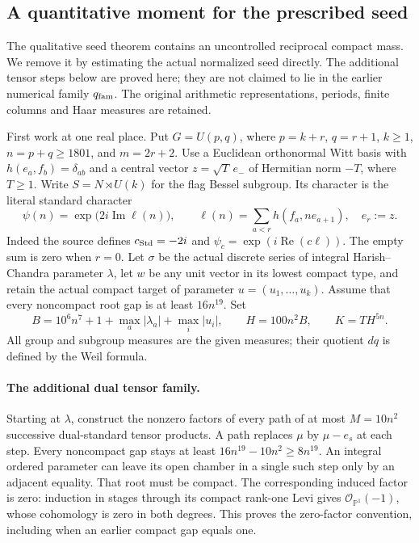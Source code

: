 \subsection{A quantitative moment for the prescribed seed}
\label{global-gram-quantitative-seed}

The qualitative seed theorem contains an uncontrolled reciprocal
compact mass.  We remove it by estimating the actual normalized
seed directly.  The additional tensor steps below are proved here;
they are not claimed to lie in the earlier numerical family
$q_{\rm fam}$.  The original arithmetic representations, periods,
finite columns and Haar measures are retained.

First work at one real place.  Put $G=U(p,q)$, where
$p=k+r$, $q=r+1$, $k\ge1$, $n=p+q\ge1801$, and $m=2r+2$.
Use a Euclidean orthonormal Witt basis with
$h(e_a,f_b)=\delta_{ab}$ and a central vector
$z=\sqrt T\,e_-$ of Hermitian norm $-T$, where $T\ge1$.
Write $S=N\rtimes U(k)$ for the flag Bessel subgroup.  Its
character is the literal standard character
\[
 \psi(n)=\exp\bigl(2i\operatorname{Im}\ell(n)\bigr),\qquad
 \ell(n)=\sum_{a<r}h(f_a,n e_{a+1}),\quad e_r:=z.
\]
Indeed the source defines $c_{\rm Std}=-2i$ and
$\psi_c=\exp(i\operatorname{Re}(c\ell))$.
The empty sum is zero when $r=0$.
Let $\sigma$ be the actual discrete series of integral
Harish--Chandra parameter $\lambda$, let $w$ be any unit vector
in its lowest compact type, and retain the actual compact target
of parameter $u=(u_1,\ldots,u_k)$.  Assume that every noncompact
root gap is at least $16n^{19}$.  Set
\begin{equation}\label{global-gram-quantitative-B}
 B=10^6n^7+1+\max_a|\lambda_a|+\max_i|u_i|,
 \qquad H=100n^2B,
 \qquad K=T H^{5n}.
\end{equation}
All group and subgroup measures are the given measures; their
quotient $dq$ is defined by the Weil formula.
\cite{global-gram-quantitative-source}

\paragraph{The additional dual tensor family.}
Starting at $\lambda$, construct the nonzero factors of every
path of at most $M=10n^2$ successive dual-standard tensor
products.  A path replaces $\mu$ by $\mu-e_s$ at each step.
Every noncompact gap stays at least
$16n^{19}-10n^2\ge8n^{19}$.  An integral ordered parameter can
leave its open chamber in a single such step only by an adjacent
equality.  That root must be compact.  The corresponding induced
factor is zero: induction in stages through its compact rank-one
Levi gives $\mathcal O_{\mathbb P^1}(-1)$, whose cohomology is
zero in both degrees.  This proves the zero-factor convention,
including when an earlier compact gap equals one.


